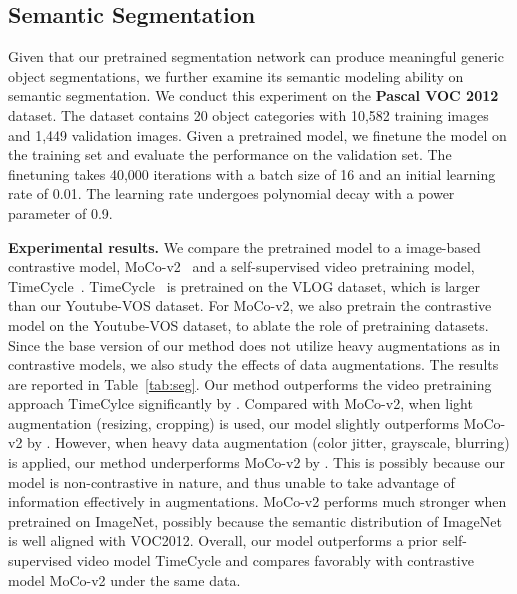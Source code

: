  








\subsection{Semantic Segmentation}
\label{sec:semantic}

Given that our pretrained segmentation network can produce meaningful generic object segmentations, we further examine its semantic modeling ability on semantic segmentation. 
We conduct this experiment on the \textbf{Pascal VOC 2012~\cite{everingham2010pascal}} dataset.
The dataset contains 20 object categories with 10,582 training images and 1,449 validation images.
Given a pretrained model, we finetune the model on the training set and evaluate the performance on the validation set.
The finetuning takes 40,000 iterations with a batch size of 16 and an initial learning rate of 0.01. 
The learning rate undergoes polynomial decay with a power parameter of 0.9.



\textbf{Experimental results.}
We compare the pretrained model to a image-based contrastive model, MoCo-v2~\cite{he2020momentum} and a self-supervised video pretraining model, TimeCycle~\cite{wang2019learning}.
TimeCycle~\cite{wang2019learning} is pretrained on the VLOG dataset, which is larger than our Youtube-VOS dataset.
For MoCo-v2, we also pretrain the contrastive model on the Youtube-VOS dataset, to ablate the role of pretraining datasets.
Since the base version of our method does not utilize heavy augmentations as in contrastive models, we also study the effects of data augmentations.
The results are reported in Table~\ref{tab:seg}.
Our method outperforms the video pretraining approach TimeCylce significantly by .
Compared with MoCo-v2, when light augmentation (resizing, cropping) is used, our model slightly outperforms MoCo-v2 by . However, when heavy data augmentation (color jitter, grayscale, blurring) is applied, our method underperforms MoCo-v2 by .
This is possibly because our model is non-contrastive in nature, and thus unable to take advantage of information effectively in augmentations.
MoCo-v2 performs much stronger when pretrained on ImageNet, possibly because the semantic distribution of ImageNet is well aligned with VOC2012.
Overall, our model outperforms a prior self-supervised video model TimeCycle and compares favorably with contrastive model MoCo-v2 under the same data.


